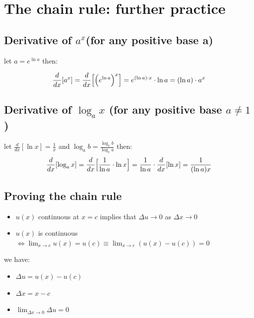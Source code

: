 \documentclass{article}
\begin{document}
\section{The chain rule: further practice}
    \subsection{Derivative of \(a^x\)(for any positive base a)}
    let \(a = e^{\ln a}\) then: 
    
    \[\frac{d}{dx}[a^x] = \frac{d}{dx}\Bigl[{\Bigl(e^{\ln a} \Bigr)}^{x}\Bigr] = e^{(\ln a)\cdot x} \cdot \ln a = (\ln a) \cdot a^{x}\] 

    \subsection{Derivative of \( \log_a x\) (for any positive base \(a \neq 1\))}
    let \(\frac{d}{dx}[\ln x] = \frac{1}{x}\) and \(\log_a b = \frac{\log_c b}{\log_c a}\) then: 
    \[\frac{d}{dx}[\log_a x] = \frac{d}{dx}\Bigl[\frac{1}{\ln a} \cdot \ln x \Bigr] = \frac{1}{\ln a} \cdot \frac{d}{dx}[\ln x] = \frac{1}{(\ln a)x} \] 
    \subsection{Proving the chain rule}
        \begin{itemize}
            \item \(u(x)\) continuous at \(x = c\) implies that \(\Delta u \to 0\) as \(\Delta x \to 0\)
            \item \(u(x)\) is continuous \(\iff \lim_{x \to c} u(x) = u(c) \equiv \lim_{x \to c}(u(x) - u(c)) = 0\) 
        \end{itemize}
        we have: 
        \begin{itemize}
            \item \(\Delta u = u(x) - u(c)\)
            \item  \(\Delta x = x - c\)
            \item \(\lim_{\Delta x \to 0} \Delta u = 0\)
        \end{itemize}
\end{document}
